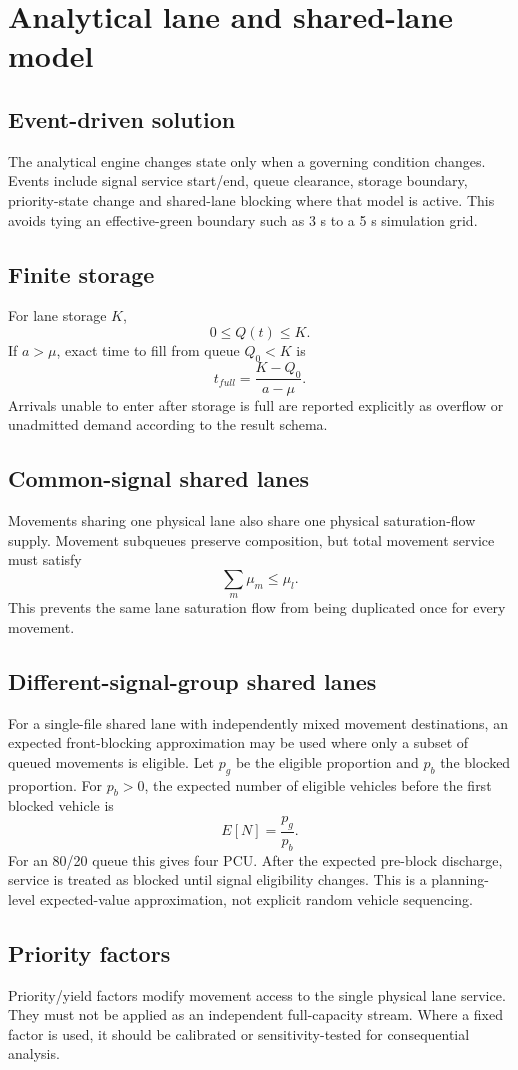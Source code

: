 \chapter{Analytical lane and shared-lane model}
\label{chap:analytical-engine}

\section{Event-driven solution}
The analytical engine changes state only when a governing condition changes.  Events
include signal service start/end, queue clearance, storage boundary, priority-state
change and shared-lane blocking where that model is active.  This avoids tying an
effective-green boundary such as 3 s to a 5 s simulation grid.

\section{Finite storage}
For lane storage $K$,
\begin{equation}
0\leq Q(t)\leq K.
\end{equation}
If $a>\mu$, exact time to fill from queue $Q_0<K$ is
\begin{equation}
t_{full}=\frac{K-Q_0}{a-\mu}.
\end{equation}
Arrivals unable to enter after storage is full are reported explicitly as overflow or
unadmitted demand according to the result schema.

\section{Common-signal shared lanes}
Movements sharing one physical lane also share one physical saturation-flow supply.
Movement subqueues preserve composition, but total movement service must satisfy
\begin{equation}
\sum_m \mu_m\leq\mu_l.
\end{equation}
This prevents the same lane saturation flow from being duplicated once for every
movement.

\section{Different-signal-group shared lanes}
For a single-file shared lane with independently mixed movement destinations, an
expected front-blocking approximation may be used where only a subset of queued
movements is eligible.  Let $p_g$ be the eligible proportion and $p_b$ the blocked
proportion.  For $p_b>0$, the expected number of eligible vehicles before the first
blocked vehicle is
\begin{equation}
E[N]=\frac{p_g}{p_b}.
\end{equation}
For an 80/20 queue this gives four PCU.  After the expected pre-block discharge, service
is treated as blocked until signal eligibility changes.  This is a planning-level
expected-value approximation, not explicit random vehicle sequencing.

\section{Priority factors}
Priority/yield factors modify movement access to the single physical lane service.
They must not be applied as an independent full-capacity stream.  Where a fixed factor
is used, it should be calibrated or sensitivity-tested for consequential analysis.
